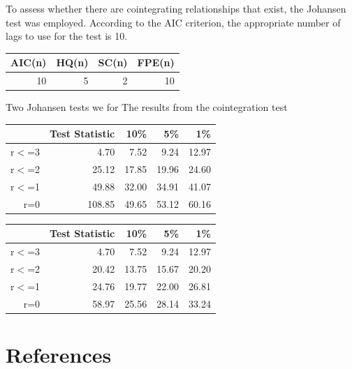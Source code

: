\documentclass[11pt,preprint, authoryear]{elsarticle}
\let\origtable\table
\let\endorigtable\endtable
\renewenvironment{table}[1][2] {
    \expandafter\origtable\expandafter[H]
} {
    \endorigtable
}
\numberwithin{equation}{section}
\numberwithin{figure}{section}
\numberwithin{table}{section}
\begin{document}
To assess whether there are cointegrating relationships that exist, the
Johansen test was employed. According to the AIC criterion, the
appropriate number of lags to use for the test is 10.

\begin{table}[H]
\centering
\begin{tabular}{rrrr}
  \hline
AIC(n) & HQ(n) & SC(n) & FPE(n) \\ 
  \hline
 10 &   5 &   2 &  10 \\ 
   \hline
\end{tabular}
\caption{Optimal Lag Selection \label{lag}} 
\end{table}

Two Johansen tests we for The results from the cointegration test

\begin{table}[H]
\centering
\begin{tabular}{rrrrr}
  \hline
 & Test Statistic & 10\% & 5\% & 1\% \\ 
  \hline
r$<$=3 & 4.70 & 7.52 & 9.24 & 12.97 \\ 
  r$<$=2 & 25.12 & 17.85 & 19.96 & 24.60 \\ 
  r$<$=1 & 49.88 & 32.00 & 34.91 & 41.07 \\ 
  r=0 & 108.85 & 49.65 & 53.12 & 60.16 \\ 
   \hline
\end{tabular}
\caption{Johansen Trace Test for Cointegration Results\label{coint}} 
\end{table}
\begin{table}[H]
\centering
\begin{tabular}{rrrrr}
  \hline
 & Test Statistic & 10\% & 5\% & 1\% \\ 
  \hline
r$<$=3 & 4.70 & 7.52 & 9.24 & 12.97 \\ 
  r$<$=2 & 20.42 & 13.75 & 15.67 & 20.20 \\ 
  r$<$=1 & 24.76 & 19.77 & 22.00 & 26.81 \\ 
  r=0 & 58.97 & 25.56 & 28.14 & 33.24 \\ 
   \hline
\end{tabular}
\caption{Johansen Eigenvalue Test for Cointegration Results\label{eigen}} 
\end{table}

\newpage

\hypertarget{references}{%
\section*{References}\label{references}}


\end{document}
